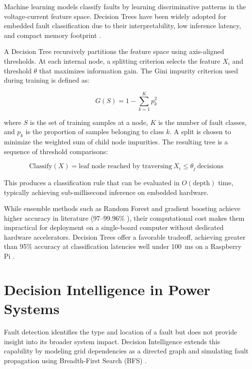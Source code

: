 Machine learning models classify faults by learning discriminative patterns in the voltage-current feature space. Decision Trees have been widely adopted for embedded fault classification due to their interpretability, low inference latency, and compact memory footprint \cite{EnergyInformatics2025,BPASTS2025}.

A Decision Tree recursively partitions the feature space using axis-aligned thresholds. At each internal node, a splitting criterion selects the feature $X_i$ and threshold $\theta$ that maximizes information gain. The Gini impurity criterion used during training is defined as:

\begin{equation}
G(S) = 1 - \sum_{k=1}^{K} p_k^2
\end{equation}

where $S$ is the set of training samples at a node, $K$ is the number of fault classes, and $p_k$ is the proportion of samples belonging to class $k$. A split is chosen to minimize the weighted sum of child node impurities. The resulting tree is a sequence of threshold comparisons:

\begin{equation}
\text{Classify}(X) = \text{leaf node reached by traversing} \ X_i \leq \theta_j \ \text{decisions}
\end{equation}

This produces a classification rule that can be evaluated in $O(\text{depth})$ time, typically achieving sub-millisecond inference on embedded hardware.

While ensemble methods such as Random Forest and gradient boosting achieve higher accuracy in literature (97--99.96\% \cite{Anwar2025}), their computational cost makes them impractical for deployment on a single-board computer without dedicated hardware accelerators. Decision Trees offer a favorable tradeoff, achieving greater than 95\% accuracy at classification latencies well under 100~ms on a Raspberry Pi \cite{EdgeML2024}.

\section{Decision Intelligence in Power Systems}

Fault detection identifies the type and location of a fault but does not provide insight into its broader system impact. Decision Intelligence extends this capability by modeling grid dependencies as a directed graph and simulating fault propagation using Breadth-First Search (BFS) \cite{HybridCascade2025}.

